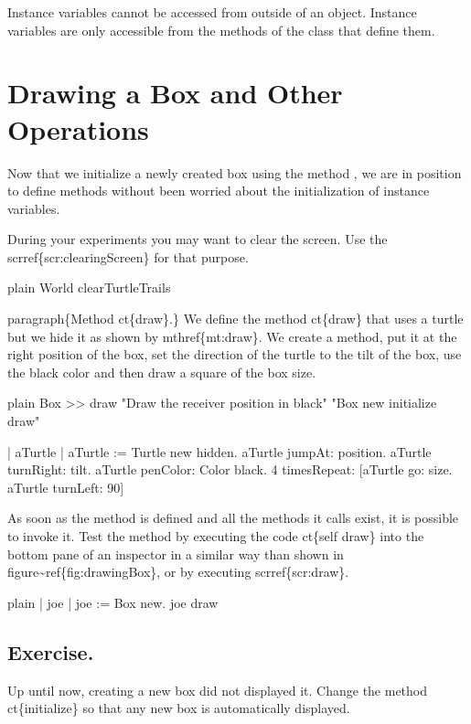 \documentclass[10pt,twoside,english]{_support/latex/sbabook/sbabook}
\begin{document}
\begin{note}
Instance variables cannot be accessed from outside of  an object. Instance variables are only accessible from the methods of  the class that define them.
\end{note}
\section{Drawing a Box and Other Operations}
Now that we initialize a newly created box using the method , we are in position to define methods without been worried about the initialization of instance variables.  

During your experiments you may want to clear the screen.  Use the scrref\{scr:clearingScreen\} for that purpose.

\begin{displaycode}{plain}
World clearTurtleTrails
\end{displaycode}

paragraph\{Method ct\{draw\}.\} We define the method ct\{draw\} that uses a
turtle but we hide it as shown by mthref\{mt:draw\}.  We create a
method, put it at the right position of the box, set the direction of
the turtle to the tilt of the box, use the black color and then draw a
square of the box size.

\begin{displaycode}{plain}
Box >> draw
   "Draw the receiver position in black"
   "Box new initialize draw"
	
   | aTurtle |
   aTurtle := Turtle new hidden.
   aTurtle jumpAt: position.
   aTurtle turnRight: tilt.
   aTurtle penColor: Color black.
   4 timesRepeat: [aTurtle go: size. 
                  aTurtle turnLeft: 90]
\end{displaycode}

As soon as the method is defined and all the methods it calls exist, it is possible to invoke it.
Test the method by executing the code ct\{self draw\} into the bottom pane of an inspector in a similar way than shown in figure\textasciitilde{}ref\{fig:drawingBox\}, or by executing scrref\{scr:draw\}.

\begin{displaycode}{plain}
| joe  |
joe := Box new.
joe draw
\end{displaycode}
\subsection{Exercise.}
Up until now, creating a new box did not displayed it.  Change the method ct\{initialize\} so that any new box is automatically displayed.
\end{document}
